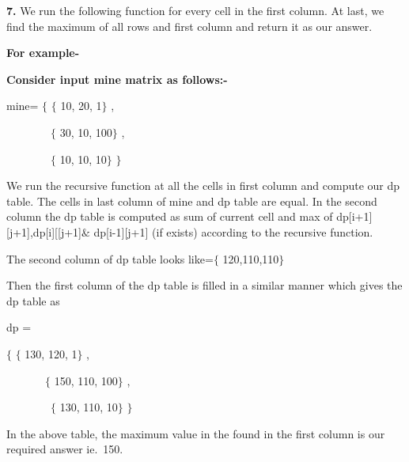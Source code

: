 \documentclass[10pt]{report}
\begin{document}
\begin{multicols}{2}
\vspace{\baselineskip}
\textbf{7. } We run the following function for every cell in the first column. At last, we find the maximum of all rows and first column and return it as our answer.\par


\vspace{\baselineskip}
\textbf{For example-}\par


\vspace{\baselineskip}
\textbf{Consider input mine matrix as follows:-}\par

mine= $ \{ $ $ \{ $ 10, 20, 1$ \} $ ,\par

\ \ \ \ \ \ \  \tab \  $ \{ $ 30, 10, 100$ \} $ ,\par

\ \ \ \ \ \ \ \  \tab   $ \{ $ 10, 10, 10$ \} $ $ \} $ \par


\vspace{\baselineskip}
We run the recursive function at all the cells in first column and compute our dp table. The cells in last column of mine and dp table are equal. In the second column the dp table is computed as sum of current cell and max of  dp[i+1][j+1],dp[i][[j+1]$\&$ dp[i-1][j+1] (if exists) according to the recursive function.\par

The second column of dp table looks like=$ \{ $ 120,110,110$ \} $ \par

Then the first column of the dp table is filled in a similar manner which gives the dp table as\par

{\fontsize{12pt}{14.4pt}\selectfont dp =\tab \par}$ \{ $ $ \{ $ 130, 120, 1$ \} $ ,\par

\ \ \ \ \ \ \  \tab  $ \{ $ 150, 110, 100$ \} $ ,\par

\ \ \ \ \ \ \ \  \tab  $ \{ $ 130, 110, 10$ \} $ $ \} $ \par


\vspace{\baselineskip}
In the above table, the maximum value in the found in the first column is our required answer ie.\ 150.  \par




\end{multicols}
\end{document}
